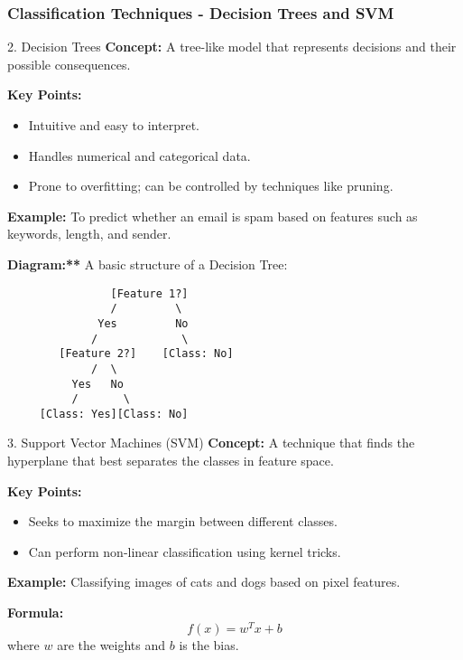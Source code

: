 \documentclass[aspectratio=169]{beamer}
\begin{document}
\begin{frame}[fragile]
    \frametitle{Classification Techniques - Decision Trees and SVM}
    \begin{block}{2. Decision Trees}
        \textbf{Concept:} A tree-like model that represents decisions and their possible consequences.
        
        \textbf{Key Points:}
        \begin{itemize}
            \item Intuitive and easy to interpret.
            \item Handles numerical and categorical data.
            \item Prone to overfitting; can be controlled by techniques like pruning.
        \end{itemize}

        \textbf{Example:} To predict whether an email is spam based on features such as keywords, length, and sender.

        \textbf{Diagram:**} A basic structure of a Decision Tree:
        \begin{verbatim}
                [Feature 1?]
                /         \
              Yes         No
             /             \
        [Feature 2?]    [Class: No]
             /  \
          Yes   No
          /       \
     [Class: Yes][Class: No]
        \end{verbatim}
    \end{block}

    \begin{block}{3. Support Vector Machines (SVM)}
        \textbf{Concept:} A technique that finds the hyperplane that best separates the classes in feature space.
        
        \textbf{Key Points:}
        \begin{itemize}
            \item Seeks to maximize the margin between different classes.
            \item Can perform non-linear classification using kernel tricks.
        \end{itemize}

        \textbf{Example:} Classifying images of cats and dogs based on pixel features.

        \textbf{Formula:}
        \begin{equation}
            f(x) = w^T x + b
        \end{equation}
        where \( w \) are the weights and \( b \) is the bias.
    \end{block}
\end{frame}
\end{document}
